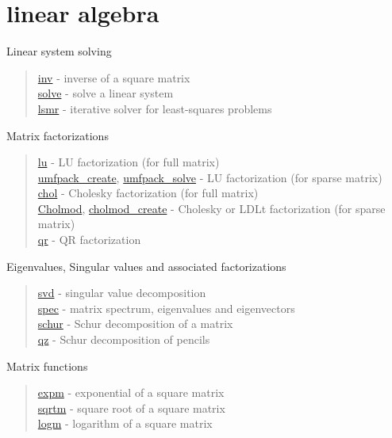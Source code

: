 \chapter*{linear algebra}

Linear system solving
\begin{quote}
\noindent
\hyperlink{inv}{inv} -  inverse of a square matrix  \\
\hyperlink{solve}{solve} - solve a linear system \\
\hyperlink{lsmr}{lsmr} - iterative solver for least-squares problems \\
\end{quote}

Matrix factorizations

\begin{quote}
\noindent
\hyperlink{lu}{lu} - LU factorization (for full matrix) \\
\hyperlink{umfpack_create}{umfpack\_create},\;
\hyperlink{umfpack_solve}{umfpack\_solve} - LU factorization (for sparse matrix) \\
\hyperlink{chol}{chol} - Cholesky factorization (for full matrix) \\
\hyperlink{Cholmod}{Cholmod},\;
\hyperlink{cholmod_create}{cholmod\_create} - Cholesky or LDLt factorization (for sparse matrix) \\
\hyperlink{qr}{qr} - QR factorization
\end{quote}


Eigenvalues, Singular values and associated factorizations

\begin{quote}
\noindent
\hyperlink{svd}{svd} - singular value decomposition \\
\hyperlink{spec}{spec} - matrix spectrum, eigenvalues and eigenvectors\\
\hyperlink{schur}{schur} - Schur decomposition of a matrix \\
\hyperlink{qz}{qz} - Schur decomposition of pencils \\
\end{quote}


Matrix functions

\begin{quote}
\noindent
\hyperlink{expm}{expm} - exponential of a square matrix \\ %
\hyperlink{sqrtm}{sqrtm} - square root of a square matrix \\ %
\hyperlink{logm}{logm} - logarithm of a square matrix \\ %
\end{quote}


